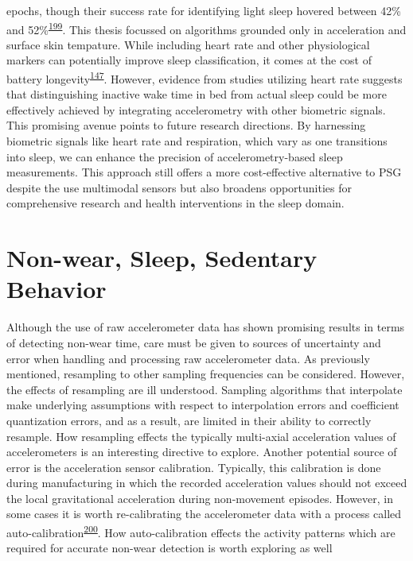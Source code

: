 \documentclass[
  10pt,
]{scrbook}
\begin{document}
epochs, though their success rate for identifying light sleep hovered
between 42\% and
52\%\textsuperscript{\protect\hyperlink{ref-muzet_2016}{199}}. This
thesis focussed on algorithms grounded only in acceleration and surface
skin tempature. While including heart rate and other physiological
markers can potentially improve sleep classification, it comes at the
cost of battery
longevity\textsuperscript{\protect\hyperlink{ref-walch_sleep_2019}{147}}.
However, evidence from studies utilizing heart rate suggests that
distinguishing inactive wake time in bed from actual sleep could be more
effectively achieved by integrating accelerometry with other biometric
signals. This promising avenue points to future research directions. By
harnessing biometric signals like heart rate and respiration, which vary
as one transitions into sleep, we can enhance the precision of
accelerometry-based sleep measurements. This approach still offers a
more cost-effective alternative to PSG despite the use multimodal
sensors but also broadens opportunities for comprehensive research and
health interventions in the sleep domain.

\hypertarget{non-wear-sleep-sedentary-behavior}{%
\section{Non-wear, Sleep, Sedentary
Behavior}\label{non-wear-sleep-sedentary-behavior}}

Although the use of raw accelerometer data has shown promising results
in terms of detecting non-wear time, care must be given to sources of
uncertainty and error when handling and processing raw accelerometer
data. As previously mentioned, resampling to other sampling frequencies
can be considered. However, the effects of resampling are ill
understood. Sampling algorithms that interpolate make underlying
assumptions with respect to interpolation errors and coefficient
quantization errors, and as a result, are limited in their ability to
correctly resample. How resampling effects the typically multi-axial
acceleration values of accelerometers is an interesting directive to
explore. Another potential source of error is the acceleration sensor
calibration. Typically, this calibration is done during manufacturing in
which the recorded acceleration values should not exceed the local
gravitational acceleration during non-movement episodes. However, in
some cases it is worth re-calibrating the accelerometer data with a
process called
auto-calibration\textsuperscript{\protect\hyperlink{ref-hees_2014}{200}}.
How auto-calibration effects the activity patterns which are required
for accurate non-wear detection is worth exploring as well
\end{document}
